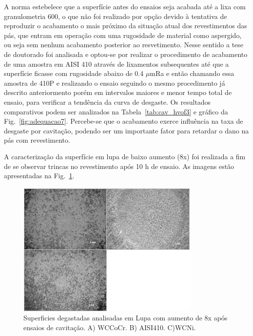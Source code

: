 A norma estebelece que a superfície antes do ensaios seja acabada até a lixa com
granulometria 600, o que não foi realizado por opção devido à tentativa de
reproduzir o acabamento o mais próximo da situação atual dos revestimentos das
pás, que entram em operação com uma rugosidade de material como aspergido, ou
seja sem nenhum acabamento posterior ao resvetimento. Nesse sentido a tese de
doutorado \cite{xiaojun2002effect} foi analisada e optou-se por realizar o
procedimento de acabamento de uma amostra em AISI 410 através de lixamentos
subsequentes até que a superfície ficasse com rugosidade abaixo de 0.4 $\mu$mRa
e então chamando essa amostra de 410P e realizando o ensaio seguindo o mesmo
procedimento já descrito anteriormento porém em intervalos maiores e menor tempo
total de ensaio, para verificar a tendência da curva de desgaste. Os resultados
comparativos podem ser analizados na Tabela~\ref{tab:cav_hvof3} e gráfico da
Fig.~\ref{fig:adequacao7}. Percebe-se que o acabamento exerce influência na taxa
de desgaste por cavitação, podendo ser um importante fator para retardar o dano
na pás com revestimento.

A caracterização da superfície em lupa de baixo aumento (8x) foi realizada a fim
de se observar trincas no revestimento após 10 h de ensaio. As imagens estão
apresentadas na Fig.~\ref{fig:adequacao8}.

\begin{figure}
	\centering
	\includegraphics[width=1\columnwidth]{method/figs/adequacao/adequacao8.png}
    \caption{Superficies degastadas analisadas em Lupa com aumento de 8x após ensaios de cavitação. A) WCCoCr. B) AISI410. C)WCNi.}
    \label{fig:adequacao8}
\end{figure}